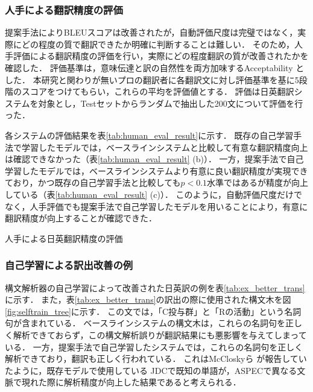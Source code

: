 \documentclass[japanese]{jnlp_1.4}
\begin{document}
\subsubsection{人手による翻訳精度の評価}
\label{sec:human_eval}

提案手法によりBLEUスコアは改善されたが，自動評価尺度は完璧ではなく，実際にどの程度の質で翻訳できたか明確に判断することは難しい．
そのため，人手評価による翻訳精度の評価を行い，実際にどの程度翻訳の質が改善されたかを確認した．
評価基準は，意味伝達と訳の自然性を両方加味するAcceptability \cite{goto11ntcir} とした．
本研究と関わりが無いプロの翻訳者に各翻訳文に対し評価基準を基に5段階のスコアをつけてもらい，これらの平均を評価値とする．
評価は日英翻訳システムを対象とし，Testセットからランダムで抽出した200文について評価を行った．

各システムの評価結果を表\ref{tab:human_eval_result}に示す．
既存の自己学習手法で学習したモデルでは，ベースラインシステムと比較して有意な翻訳精度向上は確認できなかった（表\ref{tab:human_eval_result} (b)）．
一方，提案手法で自己学習したモデルでは，ベースラインシステムより有意に良い翻訳精度が実現できており，かつ既存の自己学習手法と比較しても$p<0.1$水準ではあるが精度が向上している（表\ref{tab:human_eval_result} (c)）．
このように，自動評価尺度だけでなく，人手評価でも提案手法で自己学習したモデルを用いることにより，有意に翻訳精度が向上することが確認できた．

\begin{table}[b] 
\caption{人手による日英翻訳精度の評価}
\label{tab:human_eval_result}

\end{table}


\subsubsection{自己学習による訳出改善の例}
\label{sec:ex_improve}

構文解析器の自己学習によって改善された日英訳の例を表\ref{tab:ex_better_trans}に示す．
また，表\ref{tab:ex_better_trans}の訳出の際に使用された構文木を図\ref{fig:selftrain_tree}に示す．
この文では，「C投与群」と「Rの活動」という名詞句が含まれている．
ベースラインシステムの構文木は，これらの名詞句を正しく解析できておらず，この構文解析誤りが翻訳結果にも悪影響を与えてしまっている．
一方，提案手法で自己学習したシステムでは，これらの名詞句を正しく解析できており，翻訳も正しく行われている．
これはMcCloskyら \cite{mcclosky08coling} が報告していたように，既存モデルで使用している
JDCで既知の単語が，ASPECで異なる文脈で現れた際に解析精度が向上した結果であると考えられる．
\end{document}
